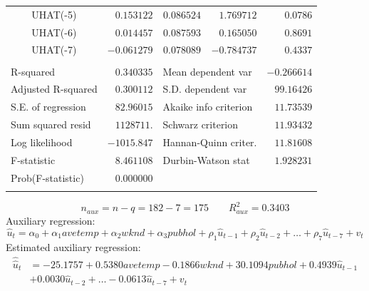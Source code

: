 \documentclass[12pt]{report}
\begin{document}
\begin{table}[H]
\begin{tabular}{lrrrr}
		\multicolumn{1}{c}{UHAT(-5)}&\multicolumn{1}{r}{$0.153122$}&\multicolumn{1}{r}{$0.086524$}&\multicolumn{1}{r}{$1.769712$}&\multicolumn{1}{r}{$0.0786$}\\
		\multicolumn{1}{c}{UHAT(-6)}&\multicolumn{1}{r}{$0.014457$}&\multicolumn{1}{r}{$0.087593$}&\multicolumn{1}{r}{$0.165050$}&\multicolumn{1}{r}{$0.8691$}\\
		\multicolumn{1}{c}{UHAT(-7)}&\multicolumn{1}{r}{$-0.061279$}&\multicolumn{1}{r}{$0.078089$}&\multicolumn{1}{r}{$-0.784737$}&\multicolumn{1}{r}{$0.4337$}\\
		[4.5pt] \hline \\ [-4.5pt]
		\multicolumn{1}{l}{R-squared}&\multicolumn{1}{r}{$0.340335$}&\multicolumn{2}{l}{Mean dependent var}&\multicolumn{1}{r}{$-0.266614$}\\
		\multicolumn{1}{l}{Adjusted R-squared}&\multicolumn{1}{r}{$0.300112$}&\multicolumn{2}{l}{S.D. dependent var}&\multicolumn{1}{r}{$99.16426$}\\
		\multicolumn{1}{l}{S.E. of regression}&\multicolumn{1}{r}{$82.96015$}&\multicolumn{2}{l}{Akaike info criterion}&\multicolumn{1}{r}{$11.73539$}\\
		\multicolumn{1}{l}{Sum squared resid}&\multicolumn{1}{r}{$1128711.$}&\multicolumn{2}{l}{Schwarz criterion}&\multicolumn{1}{r}{$11.93432$}\\
		\multicolumn{1}{l}{Log likelihood}&\multicolumn{1}{r}{$-1015.847$}&\multicolumn{2}{l}{Hannan-Quinn criter.}&\multicolumn{1}{r}{$11.81608$}\\
		\multicolumn{1}{l}{F-statistic}&\multicolumn{1}{r}{$8.461108$}&\multicolumn{2}{l}{Durbin-Watson stat}&\multicolumn{1}{r}{$1.928231$}\\
		\multicolumn{1}{l}{Prob(F-statistic)}&\multicolumn{1}{r}{$0.000000$}&\multicolumn{1}{c}{}&\multicolumn{1}{c}{}&\multicolumn{1}{c}{}\\
		[4.5pt] \hline \\ [-4.5pt]
	\end{tabular}
\end{table}
\vspace{-\baselineskip} $$n_{aux} = n - q = 182 - 7 = 175 \qquad R^2_{aux} = 0.3403$$
\noindent Auxiliary regression: $$\hat{u}_t = \alpha_0 + \alpha_1avetemp + \alpha_2wknd + \alpha_3pubhol + \rho_1\hat{u}_{t-1} + \rho_2\hat{u}_{t-2} + \dots + \rho_7\hat{u}_{t-7} + v_t$$ 
\noindent Estimated auxiliary regression: \begin{align*}
	\widehat{\hat{u}}_t &= -25.1757 + 0.5380avetemp -0.1866wknd + 30.1094pubhol + 0.4939\hat{u}_{t-1} \\ 
	&+ 0.0030\hat{u}_{t-2} + \dots - 0.0613\hat{u}_{t-7} + v_t
\end{align*} 
\end{document}

